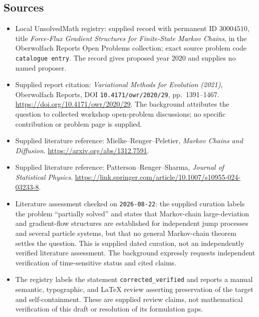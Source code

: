 \documentclass[11pt]{article}
\begin{document}
\subsection{Sources}
\begin{itemize}
\item Local UnsolvedMath registry: supplied record with permanent ID \(30004510\), title \emph{Force-Flux Gradient Structures for Finite-State Markov Chains}, in the Oberwolfach Reports Open Problems collection; exact source problem code \texttt{catalogue entry}. The record gives proposed year \(2020\) and supplies no named proposer.
\item Supplied report citation: \emph{Variational Methods for Evolution (2021)}, Oberwolfach Reports, DOI \texttt{10.4171/owr/2020/29}, pp.\ 1391--1467. \url{https://doi.org/10.4171/owr/2020/29}. The background attributes the question to collected workshop open-problem discussions; no specific contribution or problem page is supplied.
\item Supplied literature reference: Mielke--Renger--Peletier, \emph{Markov Chains and Diffusion}. \url{https://arxiv.org/abs/1312.7591}.
\item Supplied literature reference: Patterson--Renger--Sharma, \emph{Journal of Statistical Physics}. \url{https://link.springer.com/article/10.1007/s10955-024-03233-8}.
\item Literature assessment checked on \texttt{2026-08-22}: the supplied curation labels the problem ``partially solved'' and states that Markov-chain large-deviation and gradient-flow structures are established for independent jump processes and several particle systems, but that no general Markov-chain theorem settles the question. This is supplied dated curation, not an independently verified literature assessment. The background expressly requests independent verification of time-sensitive status and cited claims.
\item The registry labels the statement \texttt{corrected\_verified} and reports a manual semantic, typographic, and LaTeX review asserting preservation of the target and self-containment. These are supplied review claims, not mathematical verification of this draft or resolution of its formulation gaps.
\end{itemize}
\end{document}
